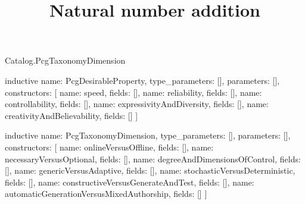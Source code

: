 \begin{lexlean}{Catalog.PcgTaxonomyDimension}
\title{Natural number addition}
\begin{semanticmodule}
inductive{
  name: PcgDesirableProperty,
  type_parameters: [],
  parameters: [],
  constructors: [
    {name: speed, fields: []},
    {name: reliability, fields: []},
    {name: controllability, fields: []},
    {name: expressivityAndDiversity, fields: []},
    {name: creativityAndBelievability, fields: []}
  ]
}

inductive{
  name: PcgTaxonomyDimension,
  type_parameters: [],
  parameters: [],
  constructors: [
    {name: onlineVersusOffline, fields: []},
    {name: necessaryVersusOptional, fields: []},
    {name: degreeAndDimensionsOfControl, fields: []},
    {name: genericVersusAdaptive, fields: []},
    {name: stochasticVersusDeterministic, fields: []},
    {name: constructiveVersusGenerateAndTest, fields: []},
    {name: automaticGenerationVersusMixedAuthorship, fields: []}
  ]
}
\end{semanticmodule}
\end{lexlean}
